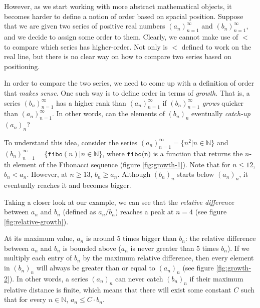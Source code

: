 \documentclass[11pt]{article}
\begin{document}
However, as we start working with more abstract mathematical objects, it becomes harder to define a notion of order based on spacial position. Suppose that we are given two series of positive real numbers $(a_n)_{n=1}^\infty$ and $(b_n)_{n=1}^\infty$, and we decide to assign some order to them. Clearly, we cannot make use of $<$ to compare which series has higher-order. Not only is $<$ defined to work on the real line, but there is no clear way on how to compare two series based on positioning.

In order to compare the two series, we need to come up with a definition of order that \textit{makes sense}. One such way is to define order in terms of \textit{growth}. That is, a series $(b_n)_{n=1}^\infty$ has a higher rank than $(a_n)_{n=1}^\infty$ if $(b_n)_{n=1}^\infty$ \textit{grows} quicker than $(a_n)_{n=1}^\infty$. In other words, can the elements of $(b_n)_n$ eventually \textit{catch-up} $(a_n)_n$?

To understand this idea, consider the series $(a_n)_{n=1}^\infty = \{n^2 \vert n\in\mathbb{N}\}$ and $(b_n)_{n=1}^\infty = \{\texttt{fibo}(n) \vert n\in\mathbb{N}\}$, where $\texttt{fibo(n)}$ is a function that returns the $n$-th element of the Fibonacci sequence (figure \ref{fig:growth-1}). Note that for $n \leq 12$, $b_n < a_n$. However, at $n\geq 13$, $b_n \geq a_n$. Although $(b_n)_n$ starts below $(a_n)_n$, it eventually reaches it and becomes bigger.


\begin{figure*}[h!]
	\centering
	\scalebox{0.5}{}
	\caption{Plot of two series}
	\label{fig:growth-1}
\end{figure*}

Taking a closer look at our example, we can see that the \textit{relative difference} between $a_n$ and $b_n$ (defined as $a_n / b_n$) reaches a peak at $n=4$ (see figure \ref{fig:relative-growth}).

\begin{figure*}[h!]
	\centering
	\scalebox{0.5}{}
	\caption{Relative difference of the series $(a_n)_n$ and $(b_n)_n$}
	\label{fig:relative-growth}
\end{figure*}

At its maximum value, $a_n$ is around 5 times bigger than $b_n$: the relative difference between $a_n$ and $b_n$ is bounded above ($a_n$ is never greater than 5 times $b_n$). If we multiply each entry of $b_n$ by the maximum relative difference, then every element in $(b_n)_n$ will always be greater than or equal to $(a_n)_n$ (see figure \ref{fig:growth-2}). In other words, a series $(a_n)_n$ can never catch $(b_n)_n$ if their maximum relative distance is finite, which means that there will exist some constant $C$ such that for every $n\in\mathbb{N}$, $a_n \leq C \cdot b_n$.
\end{document}
